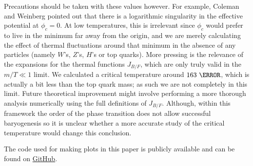 \documentclass[%
 reprint,
nofootinbib,
 amsmath,amssymb,
 aps,
floatfix,
]{revtex4-1}
\begin{document}
Precautions should be taken with these values however.
For example, Coleman and Weinberg \cite{cw73} pointed out that there is a logarithmic singularity in the effective potential at $\phi_c=0$.
At low temperatures, this is irrelevant since $\phi_c$ would prefer to live in the minimum far away from the origin, and we are merely calculating the effect of thermal fluctuations around that minimum in the absence of any particles (namely $W$'s, $Z$'s, $H$'s or top quarks).
More pressing is the relevance of the expansions for the thermal functions $J_{B/F}$, which are only truly valid in the $m/T\ll1$ limit.
We calculated a critical temperature around $163~\GeV$, which is actually a bit less than the top quark mass; as such we are not completely in this limit.
Future theoretical improvement might involve performing a more thorough analysis numerically using the full definitions of $J_{B/F}$.
Although, within this framework the order of the phase transition does not allow successful baryogenesis so it is unclear whether a more accurate study of the critical temperature would change this conclusion.

The code used for making plots in this paper is publicly available and can be found on \href{https://github.com/jeffouellette/EWPTstudy}{GitHub}.
\newpage


\end{document}
